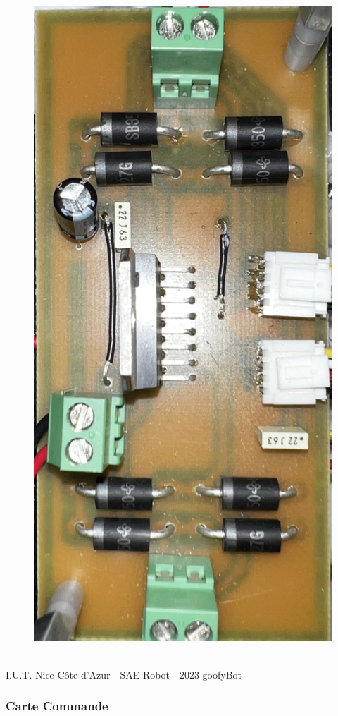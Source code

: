 \begin{figure}[H]
\centering
\begin{minipage}{.5\textwidth}
  \centering
  \includegraphics[width=.6\linewidth, angle = -90]{img/cartes/hacheur.jpeg}
  \label{fig:hacheur}
\end{minipage}
\end{figure}

\vfill
\noindent\makebox[\linewidth]{\rule{.8\paperwidth}{.6pt}}\\[0.2cm]
I.U.T. Nice Côte d'Azur - SAE Robot - 2023 \hfill goofyBot
\noindent\makebox[\linewidth]{\rule{.8\paperwidth}{.6pt}}
\newpage





\subsubsection{Carte Commande}

